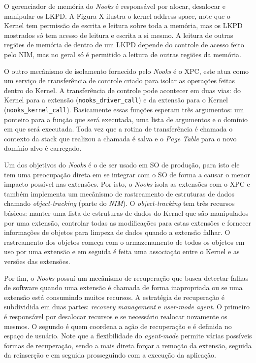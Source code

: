 
O gerenciador de memória do \emph{Nooks} é responsável por alocar, desalocar e
manipular os LKPD. A Figura X ilustra o kernel address space, note que o Kernel
tem permissão de escrita e leitura sobre toda a memória, mas os LKPD mostrados
só tem acesso de leitura e escrita a si mesmo. A leitura de outras regiões de
memória de dentro de um LKPD depende do controle de acesso feito pelo NIM, mas
no geral só é permitido a leitura de outras regiões da memória.

O outro mecânismo de isolamento fornecido pelo \emph{Nooks} é o XPC, este atua
como um serviço de transferência de controle criado para isolar as operações
feitas dentro do Kernel. A transferência de controle pode acontecer em duas
vias: do Kernel para a extensão (\texttt{nooks\_driver\_call}) e da extensão
para o Kernel (\texttt{nooks\_kernel\_call}). Basicamente essas funções esperam
três argumentos: um ponteiro para a função que será executada, uma lista de
argumentos e o domínio em que será executada. Toda vez que a rotina de
transferência é chamada o contexto da stack que realizou a chamada é salva e o
\emph{Page Table} para o novo domínio alvo é carregado.

Um dos objetivos do \emph{Nooks} é o de ser usado em SO de produção, para isto
ele tem uma preocupação direta em se integrar com o SO de forma a causar o
menor impacto possível nas extensões. Por isto, o \emph{Nooks} isola as
extensões com o XPC e também implementa um mecânismo de rastreamento de
estruturas de dados chamado \emph{object-tracking} (parte do \emph{NIM}). O
\emph{object-tracking} tem três recursos básicos: manter uma lista de
estruturas de dados do Kernel que são manipulados por uma extensão, controlar
todas as modificações para estas extensões e fornecer informações de objetos
para limpeza de dados quando a extensão falhar. O rastreamento dos objetos
começa com o armazenamento de todos os objetos em uso por uma extensão e em
seguida é feita uma associação entre o Kernel e as versões das extensões.

Por fim, o \emph{Nooks} possuí um mecânismo de recuperação que busca detectar
falhas de software quando uma extensão é chamada de forma inapropriada ou se
uma extensão está consumindo muitos recursos. A estratégia de recuperação é
subdividida em duas partes: \emph{recovery management} e \emph{user-mode
agent}. O primeiro é responsável por desalocar recursos e se necessário
realocar novamente os mesmos. O segundo é quem coordena a ação de recuperação e
é definida no espaço de usuário. Note que a flexibilidade do \emph{agent-mode}
permite várias possíveis formas de recuperação, sendo a mais direta forçar a
remoção da extensão, seguida da reinserção e em seguida prosseguindo com a
execução da aplicação.

